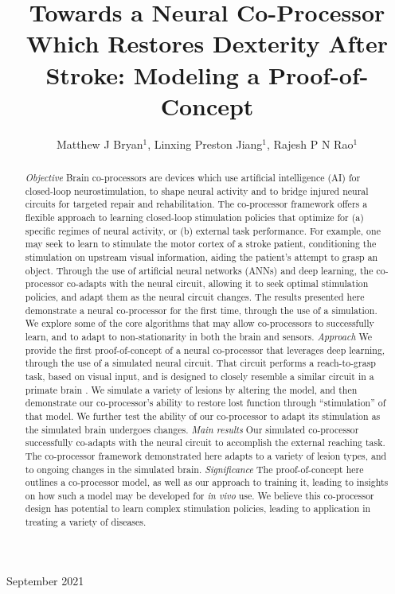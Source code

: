\documentclass[12pt]{iopart}
\begin{document}
\title[Modeling a Neural Co-Processor]
{Towards a Neural Co-Processor Which Restores Dexterity After Stroke: Modeling a Proof-of-Concept}

\author{Matthew J Bryan$^{1}$, Linxing Preston Jiang$^{1}$, Rajesh P N Rao$^{1}$}

\address{$^{1}$ Neural Systems Laboratory, Department of Computer
Science and Engineering, University of Washington, Box 352350,
Seattle, WA 98105, USA}

\vspace{10pt}
\begin{indented}
\item[]September 2021
\end{indented}

\begin{abstract}
\textit{Objective} Brain co-processors \cite{rao.coproc} are devices which use artificial
intelligence (AI) for closed-loop neurostimulation, to shape neural activity and to bridge
injured neural circuits for targeted repair and rehabilitation. The co-processor framework
offers a flexible approach to learning closed-loop stimulation policies that optimize for
(a) specific regimes of neural activity, or (b) external task performance.
For example, one may seek to learn to stimulate the motor cortex of a stroke patient,
conditioning the stimulation on upstream visual information, aiding the patient's
attempt to grasp an object. Through the use of artificial neural
networks (ANNs) and deep learning, the co-processor co-adapts with the
neural circuit, allowing it to seek optimal stimulation policies, and adapt them
as the neural circuit changes. The results presented here demonstrate a
neural co-processor for the first time, through the use of a simulation. We
explore some of the core algorithms that may allow co-processors to successfully
learn, and to adapt to non-stationarity in both the brain and sensors.
\textit{Approach} We provide the first proof-of-concept of a neural co-processor that
leverages deep learning, through the use of a simulated neural circuit.
That circuit performs a reach-to-grasp task, based on visual input, and is designed to
closely resemble a similar circuit in a primate brain \cite{michaels.mrnn}. We simulate
a variety of lesions by altering the model, and then demonstrate our co-processor's ability
to restore lost function through ``stimulation'' of that model. We further test the
ability of our co-processor to adapt its stimulation as the simulated brain undergoes changes.
\textit{Main results} Our simulated co-processor successfully co-adapts with the neural
circuit to accomplish the external reaching task. The co-processor framework
demonstrated here adapts to a variety of lesion types, and to ongoing changes in the
simulated brain.
\textit{Significance} The proof-of-concept here outlines a co-processor model, as well
as our approach to training it, leading to insights on how such a model may be
developed for \textit{in vivo} use. We believe this co-processor design has potential to
learn complex stimulation policies, leading to application in treating a variety of
diseases.
\end{abstract}
\end{document}
